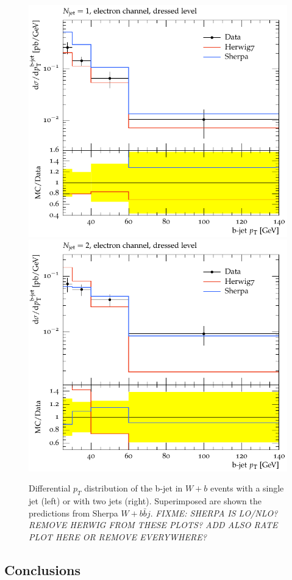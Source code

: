\documentclass[11pt]{cernrep}
\newcommand{\pt}{\ensuremath{p_{T}}\xspace}
\begin{document}
\begin{figure}[htbp]
\begin{center}
   \includegraphics[scale=0.65]{figs/wbb/sherpa/subtracted_h7_s22-1jet.pdf}
   \includegraphics[scale=0.65]{figs/wbb/sherpa/subtracted_h7_s22-2jet.pdf}
\end{center}
\caption{Differential \pt distribution of the b-jet in $W+b$ events with a
  single jet (left) or with two jets (right). Superimposed are shown the
  predictions from Sherpa $W+b\bar{b}j$. {\em FIXME: SHERPA IS LO/NLO? REMOVE
    HERWIG FROM THESE PLOTS? ADD ALSO RATE PLOT HERE OR REMOVE EVERYWHERE?
}
}
\label{wbb-pt-sherpa}
\end{figure}

\subsection{Conclusions \label{concl}}



\clearpage

\end{document}
